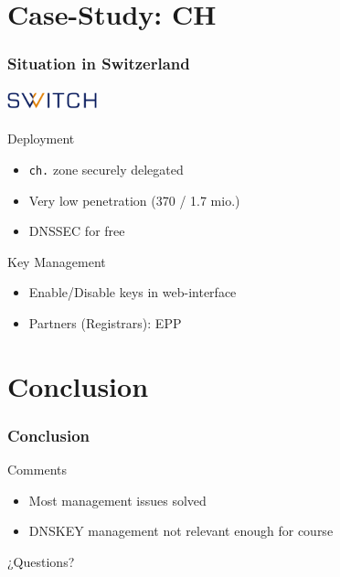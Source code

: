 \documentclass{beamer}
\begin{document}
\section{Case-Study: CH}

\begin{frame}
  \frametitle{Situation in Switzerland}
  \framesubtitle{\includegraphics[width=2.6cm]{SWITCH-logo}}

  \begin{block}{Deployment}
    \begin{itemize}
    \item \texttt{ch.} zone securely delegated
    \item Very low penetration (370 / 1.7 mio.)
    \item DNSSEC for free
    \end{itemize}
  \end{block}

  \pause

  \begin{block}{Key Management}
    \begin{itemize}
    \item Enable/Disable keys in web-interface
    \item Partners (Registrars): EPP
    \end{itemize}
  \end{block}
\end{frame}

\section{Conclusion}

\begin{frame}
  \frametitle{Conclusion}
  
  \begin{block}{Comments}
    \begin{itemize}
    \item Most management issues solved
    \item DNSKEY management not relevant enough for course
    \end{itemize}
  \end{block}

  \pause

  \begin{block}{¿Questions?}
  \end{block}
  
\end{frame}
\end{document}
